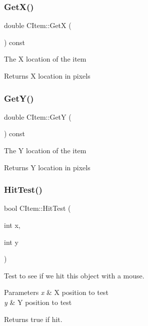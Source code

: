 \subsubsection{\texorpdfstring{Get\+X()}{GetX()}}
{\footnotesize\ttfamily double C\+Item\+::\+GetX (\begin{DoxyParamCaption}{ }\end{DoxyParamCaption}) const\hspace{0.3cm}{\ttfamily [inline]}}

The X location of the item \begin{DoxyReturn}{Returns}
X location in pixels 
\end{DoxyReturn}
\mbox{\label{class_c_item_ac0fe6be80f8ef19854d7f41b4803f658}} 
\subsubsection{\texorpdfstring{Get\+Y()}{GetY()}}
{\footnotesize\ttfamily double C\+Item\+::\+GetY (\begin{DoxyParamCaption}{ }\end{DoxyParamCaption}) const\hspace{0.3cm}{\ttfamily [inline]}}

The Y location of the item \begin{DoxyReturn}{Returns}
Y location in pixels 
\end{DoxyReturn}
\mbox{\label{class_c_item_ab3ffe07990fd2dec1e5cb65ad8ede7a4}} 
\subsubsection{\texorpdfstring{Hit\+Test()}{HitTest()}}
{\footnotesize\ttfamily bool C\+Item\+::\+Hit\+Test (\begin{DoxyParamCaption}\item[{int}]{x,  }\item[{int}]{y }\end{DoxyParamCaption})\hspace{0.3cm}{\ttfamily [virtual]}}

Test to see if we hit this object with a mouse. 
\begin{DoxyParams}{Parameters}
{\em x} & X position to test \\
\hline
{\em y} & Y position to test \\
\hline
\end{DoxyParams}
\begin{DoxyReturn}{Returns}
true if hit. 
\end{DoxyReturn}
\mbox{\label{class_c_item_a9c194f3f08e515853600cecca3e6d319}} 

